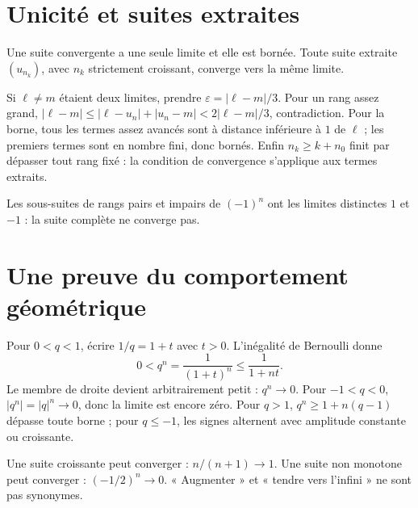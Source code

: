 \documentclass[../cours_1re.tex]{subfiles}
\begin{document}
\section{Unicité et suites extraites}
\begin{theoreme}[Complément]
Une suite convergente a une seule limite et elle est bornée. Toute suite extraite $(u_{n_k})$, avec $n_k$ strictement croissant, converge vers la même limite.
\end{theoreme}
\begin{demonstration}
Si $\ell\ne m$ étaient deux limites, prendre $\varepsilon=|\ell-m|/3$. Pour un rang assez grand,
$|\ell-m|\le|\ell-u_n|+|u_n-m|<2|\ell-m|/3$, contradiction.
Pour la borne, tous les termes assez avancés sont à distance inférieure à $1$ de $\ell$ ; les premiers termes sont en nombre fini, donc bornés.
Enfin $n_k\ge k+n_0$ finit par dépasser tout rang fixé : la condition de convergence s'applique aux termes extraits.
\end{demonstration}
Les sous-suites de rangs pairs et impairs de $(-1)^n$ ont les limites distinctes $1$ et $-1$ : la suite complète ne converge pas.
\section{Une preuve du comportement géométrique}
Pour $0<q<1$, écrire $1/q=1+t$ avec $t>0$. L'inégalité de Bernoulli donne
\[
0<q^n=\frac1{(1+t)^n}\le\frac1{1+nt}.
\]
Le membre de droite devient arbitrairement petit : $q^n\to0$.
Pour $-1<q<0$, $|q^n|=|q|^n\to0$, donc la limite est encore zéro.
Pour $q>1$, $q^n\ge1+n(q-1)$ dépasse toute borne ; pour $q\le-1$, les signes alternent avec amplitude constante ou croissante.
\begin{attention}
Une suite croissante peut converger : $n/(n+1)\to1$. Une suite non monotone peut converger : $(-1/2)^n\to0$. « Augmenter » et « tendre vers l'infini » ne sont pas synonymes.
\end{attention}
\end{document}
